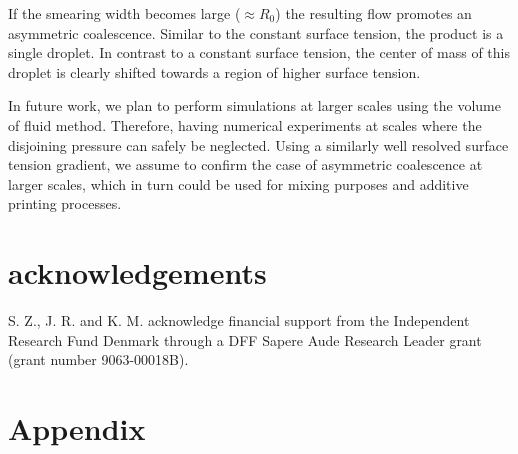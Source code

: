 If the smearing width becomes large ($\approx R_0$) the resulting flow promotes an asymmetric coalescence.
Similar to the constant surface tension, the product is a single droplet.
In contrast to a constant surface tension, the center of mass of this droplet is clearly shifted towards a region of higher surface tension.

In future work, we plan to perform simulations at larger scales using the volume of fluid method.
Therefore, having numerical experiments at scales where the disjoining pressure can safely be neglected.
Using a similarly well resolved surface tension gradient, we assume to confirm the case of asymmetric coalescence at larger scales, which in turn could be used for mixing purposes and additive printing processes.

\section{acknowledgements}
S. Z., J. R. and K. M. acknowledge financial support from the Independent Research Fund Denmark through a DFF Sapere Aude Research Leader grant (grant number 9063-00018B).

\section{Appendix}


